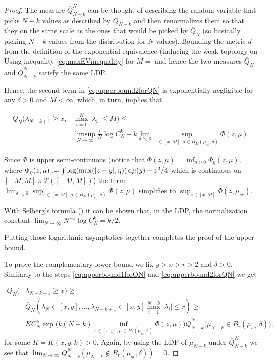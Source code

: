 \begin{proof}
	The measure $\overline Q_{N-k}^N$ can be thought of describing the random variable that picks $N-k$ values as described by $\overline Q_{N-k}$ and then renormalizes them so that they on the same scale as the ones that would be picked by $\overline Q_N$ (so basically picking $N-k$ values from the distribution for $N$ values). Bounding the metric $d$ from the definition of the exponential equivalence (inducing the weak topology on  Using inequality \ref{eq:maxEVinequality} for $M=$ and hence the two measures $\overline Q_N$ and $\overline Q_{N-k}^N$ satisfy the same LDP.
	
	Hence, the second term in \ref{eq:upperbound2forQN} is exponentially negligible for any $\delta >0$ and $M<\infty$, which, in turn, implies that
	
	\begin{align}
		Q_N(\lambda_{N-k+1}\geq x,&\max_{i=1}^N|\lambda_i|\leq M)\leq \nonumber\\
		&\limsup_{N\rightarrow\infty}\frac{1}{N}\log C_N^k + k\lim_{\delta\searrow 0}\sup_{z\in[x,M],\mu\in B_M(\mu_{sc},\delta)}\Phi(z,\mu).
	\end{align}
	
	Since $\Phi$ is upper semi-continuous (notice that $\Phi(z,\mu)=\inf_{\eta>0}\Phi_{\eta}(z,\mu)$, where $\Phi_{\eta}(z,\mu) := \int \log(\max(|z-y|,\eta))\mathop{}\!\mathrm{d}\mu(y)-z^2/4$ which is continuous on $[-M,M]\times\mathcal P([-M,M])$) the term $\lim_{\delta\searrow 0}\sup_{z\in[x,M],\mu\in B_M(\mu_{sc},\delta)}\Phi(z,\mu)$ simplifies to $\sup_{z\in[x,M]}\Phi(z,\mu_{sc})$.
	
	
	With Selberg's formula (\cite{Mehta2004random}) it can be shown that, in the LDP, the normalization constant $\lim_{N\rightarrow\infty}N^{-1}\log C_N^k = k/2$.
	
	Putting those logarithmic asymptotics together completes the proof of the upper bound.
	
	To prove the complementary lower bound we fix $y>x>r>2$ and $\delta>0$. Similarly to the steps \ref{eq:upperbound1forQN} and \ref{eq:upperbound2forQN} we get
	
	\begin{align*}
		Q_N(&\lambda_{N-k+1}\geq x)\geq \\
		&\overline Q_N(\lambda_N\in[x,y],\dots,\lambda_{N-k+1}\in[x,y]\max_{i=1}^{N-k}|\lambda_i|\leq r)\geq\\
		&KC_N^k\exp\Big(k(N-k)\inf_{z\in[x,y],\mu\in B_r(\mu_{sc},\delta)}\Phi(z,\mu)\Big)\overline Q_{N-k}^N\big(\mu_{N-k}\in B_r(\mu_{sc},\delta)\big),
	\end{align*}
	for some $K=K(x,y,k)>0$. Again, by using the LDP of $\mu_{N-k}$ under $\overline Q_{N-k}^N$ we see that $\lim_{N\rightarrow\infty}Q_{N-k}^N(\mu_{N-k}\notin B_r(\mu_{sc},\delta))=0$.
	

\end{proof}
